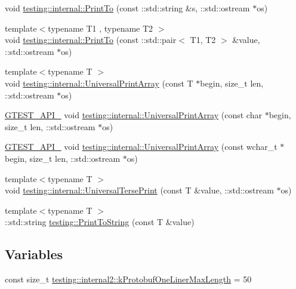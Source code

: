\begin{DoxyCompactItemize}
\item 
void \hyperlink{namespacetesting_1_1internal_af59b4f5d83276cd807c45063b14bad44}{testing\+::internal\+::\+Print\+To} (const \+::std\+::string \&s, \+::std\+::ostream $\ast$os)
\item 
{\footnotesize template$<$typename T1 , typename T2 $>$ }\\void \hyperlink{namespacetesting_1_1internal_af2c33928facbf2edf7af564278724d98}{testing\+::internal\+::\+Print\+To} (const \+::std\+::pair$<$ T1, T2 $>$ \&value, \+::std\+::ostream $\ast$os)
\item 
{\footnotesize template$<$typename T $>$ }\\void \hyperlink{namespacetesting_1_1internal_ad79d71c3110f8eb24ab352d68f29436a}{testing\+::internal\+::\+Universal\+Print\+Array} (const T $\ast$begin, size\+\_\+t len, \+::std\+::ostream $\ast$os)
\item 
\hyperlink{gtest-port_8h_aa73be6f0ba4a7456180a94904ce17790}{G\+T\+E\+S\+T\+\_\+\+A\+P\+I\+\_\+} void \hyperlink{namespacetesting_1_1internal_a72c997dbd2c562110b2cb56c359decfa}{testing\+::internal\+::\+Universal\+Print\+Array} (const char $\ast$begin, size\+\_\+t len, \+::std\+::ostream $\ast$os)
\item 
\hyperlink{gtest-port_8h_aa73be6f0ba4a7456180a94904ce17790}{G\+T\+E\+S\+T\+\_\+\+A\+P\+I\+\_\+} void \hyperlink{namespacetesting_1_1internal_ae31e146c35fd75afc6a9cc73ae2692d1}{testing\+::internal\+::\+Universal\+Print\+Array} (const wchar\+\_\+t $\ast$begin, size\+\_\+t len, \+::std\+::ostream $\ast$os)
\item 
{\footnotesize template$<$typename T $>$ }\\void \hyperlink{namespacetesting_1_1internal_afa92f5a284929dc3723e654a25feb7b9}{testing\+::internal\+::\+Universal\+Terse\+Print} (const T \&value, \+::std\+::ostream $\ast$os)
\item 
{\footnotesize template$<$typename T $>$ }\\\+::std\+::string \hyperlink{namespacetesting_aa5717bb1144edd1d262d310ba70c82ed}{testing\+::\+Print\+To\+String} (const T \&value)
\end{DoxyCompactItemize}
\subsection*{Variables}
\begin{DoxyCompactItemize}
\item 
const size\+\_\+t \hyperlink{namespacetesting_1_1internal2_a140c8efd51e63a3def98445bff107518}{testing\+::internal2\+::k\+Protobuf\+One\+Liner\+Max\+Length} = 50
\end{DoxyCompactItemize}


